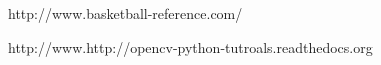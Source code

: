 \documentclass[twoside]{article}
\begin{document}
\begin{multicols}{2}
\begin{thebibliography}{99} %

http://www.basketball-reference.com/

http://www.http://opencv-python-tutroals.readthedocs.org


\end{thebibliography}


\end{multicols}
\end{document}
